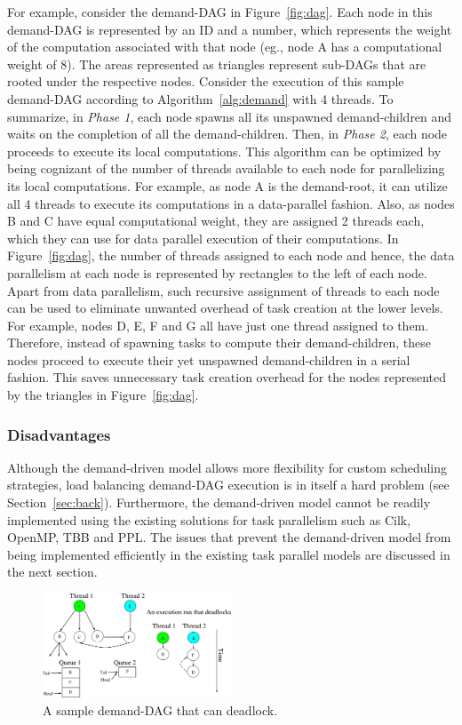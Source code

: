 \documentclass[10pt,conference]{IEEEtran}
\begin{document}
For example, consider the demand-DAG in Figure~\ref{fig:dag}. Each node in this
demand-DAG is represented by an ID and a number, which represents the weight of
the computation associated with that node (eg., node A has a computational
weight of 8). The areas represented as triangles represent sub-DAGs that are
rooted under the respective nodes.  Consider the execution of this sample
demand-DAG according to Algorithm~\ref{alg:demand} with 4 threads.  To
summarize, in \textit{Phase 1}, each node spawns all its unspawned
demand-children and waits on the completion of all the demand-children. Then,
in \textit{Phase 2}, each node proceeds to execute its local computations. This
algorithm can be optimized by being cognizant of the number of threads
available to each node for parallelizing its local computations.  For example,
as node A is the demand-root, it can utilize all 4 threads to execute its
computations in a data-parallel fashion.  Also, as nodes B and C have equal
computational weight, they are assigned 2 threads each, which they can use for
data parallel execution of their computations. In Figure~\ref{fig:dag}, the
number of threads assigned to each node and hence, the data parallelism at each
node is represented by rectangles to the left of each node.  Apart from data
parallelism, such recursive assignment of threads to each node can be used to
eliminate unwanted overhead of task creation at the lower levels. For example,
nodes D, E, F and G all have just one thread assigned to them. Therefore,
instead of spawning tasks to compute their demand-children, these nodes proceed
to execute their yet unspawned demand-children in a serial fashion. This
saves unnecessary task creation overhead for the nodes represented by the
triangles in Figure~\ref{fig:dag}.

\subsubsection{Disadvantages}
Although the demand-driven model allows more flexibility for custom scheduling
strategies, load balancing demand-DAG execution is in itself a hard problem
(see Section~\ref{sec:back}).  Furthermore, the demand-driven model cannot be
readily implemented using the existing solutions for task parallelism such as
Cilk, OpenMP, TBB and PPL. The issues that prevent the demand-driven model from
being implemented efficiently in the existing task parallel models are
discussed in the next section.

%
\begin{figure}[t]
\begin{center}
\includegraphics[width=0.50\textwidth]{figs/deadlock.eps}
\caption{A sample demand-DAG that can deadlock.}
\label{fig:deadlock}
\end{center}
\end{figure}
\end{document}
